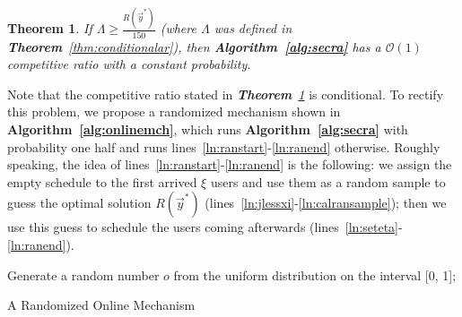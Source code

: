\documentclass[10pt,journal,compsoc]{IEEEtran}
\newtheorem{theorem}{\textbf{Theorem}}
\begin{document}
  \begin{theorem}
    If $\Lambda \geq \frac{R(\vec{y}^*)}{150}$ (where $\Lambda$ was defined in \textit{\textbf{Theorem}~\ref{thm:conditionalar}}), then \textbf{Algorithm~\ref{alg:secra}} has a $\mathcal{O}(1)$ competitive ratio with a constant probability.
    \label{thm:onlmchpartb}
  \end{theorem}
Note that the competitive ratio stated in \textit{\textbf{Theorem}~\ref{thm:onlmchpartb}} is conditional. To rectify this problem, we propose a randomized mechanism shown in \textbf{Algorithm~\ref{alg:onlinemch}}, which runs \textbf{Algorithm~\ref{alg:secra}} with probability one half and runs lines~\ref{ln:ranstart}-\ref{ln:ranend} otherwise. Roughly speaking, the idea of lines~\ref{ln:ranstart}-\ref{ln:ranend} is the following: we assign the empty schedule to the first arrived $\xi$ users and use them as a random sample to guess the optimal solution $R(\vec{y}^*)$ (lines~\ref{ln:jlessxi}-\ref{ln:calransample}); then we use this guess to schedule the users coming afterwards (lines~\ref{ln:seteta}-\ref{ln:ranend}).
\begin{algorithm}[htb]
Generate a random number $o$ from the uniform distribution on the interval [0, 1];\\
    \caption{A Randomized Online Mechanism} \label{alg:onlinemch}
  \end{algorithm}
\end{document}
